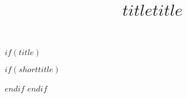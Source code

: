 $if(title)$
  \title{$title$}
  $if(shorttitle)$
    \title[$shorttitle$]{$title$}
  $endif$
$endif$